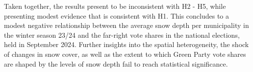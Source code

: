 \documentclass{article}
\begin{document}
Taken together, the results present to be inconsistent with H2 - H5, while presenting modest evidence that is consistent with H1. This concludes to a modest negative relationship between the average snow depth per municipality in the winter season 23/24 and the far-right vote shares in the national elections, held in September 2024. Further insights into the spatial heterogeneity, the shock of changes in snow cover, as well as the extent to which Green Party vote shares are shaped by the levels of snow depth fail to reach statistical significance. 

\vspace{2em}

\begin{table}[H]
  \caption{\textit{Heterogeneity Across Altitude: Interaction Effects}}
  \label{tab:interaction}
  
\end{table}
\newpage

\end{document}
